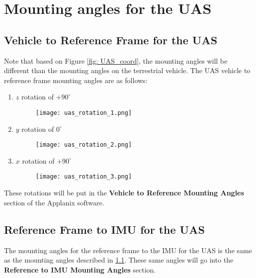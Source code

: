 \documentclass[11pt]{article}
\theoremstyle{definition}
\begin{document}
	\section{Mounting angles for the UAS}\label{sec:mounting_UAS}
	
	
	\subsection{Vehicle to Reference Frame for the UAS}\label{subsec:vehicle_to_ref_uas}
	Note that based on Figure \ref{fig: UAS_coord}, the mounting angles will be different than the mounting angles on the terrestrial vehicle.  The UAS vehicle to reference frame mounting angles are as follows:    %
	\begin{enumerate}
		\item $z$ rotation of $+90^\circ$  
		\begin{figure}[h!]\label{fig: uas_first_rotation}
			\texttt{[image: uas\_rotation\_1.png]}		
		\end{figure}
		\pagebreak
		\item  $y$ rotation of $0^\circ$
		\begin{figure}[h!]\label{fig: uas_second_rotation}
			\texttt{[image: uas\_rotation\_2.png]}	
		\end{figure}
		
		\item $x$ rotation of $+90^\circ$
		\begin{figure}[h!]\label{fig: uas_third_rotation}
			\texttt{[image: uas\_rotation\_3.png]}
			
		\end{figure}
	\end{enumerate}
	
	These rotations will be put in the \textbf{Vehicle to Reference Mounting Angles} section of the Applanix software.
	\subsection{Reference Frame to IMU for the UAS}\label{subsec:ref_to_IMU_uas}
	The mounting angles for the reference frame to the IMU for the UAS is the same as the mounting angles described in \ref{subsec:vehicle_to_ref_uas}.  These same angles will go into the \textbf{Reference to IMU Mounting Angles} section.
	
\end{document}
